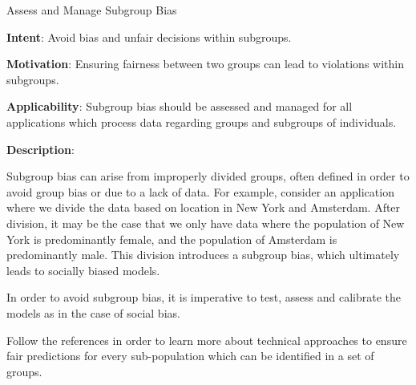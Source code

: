   
  \begin{frame}[plain]{ Assess and Manage Subgroup Bias
 }

  \textbf{Intent}: Avoid bias and unfair decisions within subgroups. 
 

  \textbf{Motivation}: Ensuring fairness between two groups can lead to violations within subgroups. 
 

  \textbf{Applicability}: Subgroup bias should be assessed and managed for all applications which process data regarding groups and subgroups of individuals. 
 

  \textbf{Description}: 

Subgroup bias can arise from improperly divided groups, often defined in order to avoid group bias or due to a lack of data.
For example, consider an application where we divide the data based on location in New York and Amsterdam.
After division, it may be the case that we only have data where the population of New York is predominantly female, and the population of Amsterdam is predominantly male.
This division introduces a subgroup bias, which ultimately leads to socially biased models.


In order to avoid subgroup bias, it is imperative to test, assess and calibrate the models as in the case of social bias.


Follow the references in order to learn more about technical approaches to ensure fair predictions for every sub-population which can be identified in a set of groups.


 


  \end{frame}


